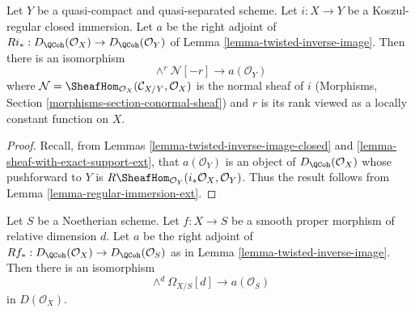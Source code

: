 \begin{lemma}
\label{lemma-regular-immersion}
Let $Y$ be a quasi-compact and quasi-separated scheme.
Let $i : X \to Y$ be a Koszul-regular closed immersion.
Let $a$ be the right adjoint of
$Ri_* : D_\QCoh(\mathcal{O}_X) \to D_\QCoh(\mathcal{O}_Y)$ of
Lemma \ref{lemma-twisted-inverse-image}. Then there is an isomorphism
$$
\wedge^r\mathcal{N}[-r] \longrightarrow a(\mathcal{O}_Y)
$$
where
$\mathcal{N} = \SheafHom_{\mathcal{O}_X}(\mathcal{C}_{X/Y}, \mathcal{O}_X)$
is the normal sheaf of $i$
(Morphisms, Section \ref{morphisms-section-conormal-sheaf})
and $r$ is its rank viewed as a locally constant
function on $X$.
\end{lemma}

\begin{proof}
Recall, from Lemmas \ref{lemma-twisted-inverse-image-closed}
and \ref{lemma-sheaf-with-exact-support-ext},
that $a(\mathcal{O}_Y)$ is an object of $D_\QCoh(\mathcal{O}_X)$ whose
pushforward to $Y$ is
$R\SheafHom_{\mathcal{O}_Y}(i_*\mathcal{O}_X, \mathcal{O}_Y)$.
Thus the result follows from Lemma \ref{lemma-regular-immersion-ext}.
\end{proof}

\begin{lemma}
\label{lemma-smooth-proper}
Let $S$ be a Noetherian scheme.
Let $f : X \to S$ be a smooth proper morphism of relative dimension $d$.
Let $a$ be the right adjoint of
$Rf_* : D_\QCoh(\mathcal{O}_X) \to D_\QCoh(\mathcal{O}_S)$ as in
Lemma \ref{lemma-twisted-inverse-image}. Then there is an isomorphism
$$
\wedge^d \Omega_{X/S}[d] \longrightarrow a(\mathcal{O}_S)
$$
in $D(\mathcal{O}_X)$.
\end{lemma}

